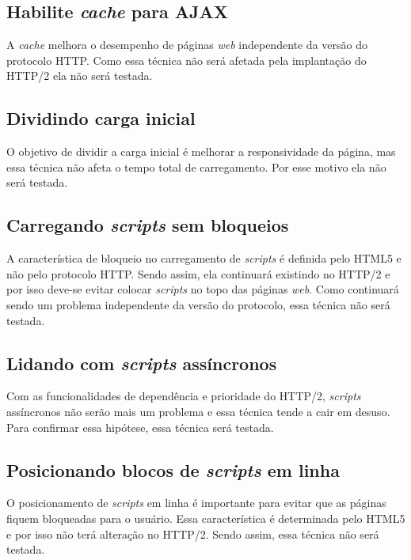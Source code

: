 \subsection{Habilite \textit{cache} para AJAX}
\label{subsec:preliminares_tec14}
A \textit{cache} melhora o desempenho de páginas \textit{web} independente da versão do protocolo HTTP. Como essa técnica não será afetada pela implantação do HTTP/2 ela não será testada.

\subsection{Dividindo carga inicial}
\label{subsec:preliminares_tec15}
O objetivo de dividir a carga inicial é melhorar a responsividade da página, mas essa técnica não afeta o tempo total de carregamento. Por esse motivo ela não será testada.

\subsection{Carregando \textit{scripts} sem bloqueios}
\label{subsec:preliminares_tec16}
A característica de bloqueio no carregamento de \textit{scripts} é definida pelo HTML5 e não pelo protocolo HTTP. Sendo assim, ela continuará existindo no HTTP/2 e por isso deve-se evitar colocar \textit{scripts} no topo das páginas \textit{web}. Como continuará sendo um problema independente da versão do protocolo, essa técnica não será testada.

\subsection{Lidando com \textit{scripts} assíncronos}
\label{subsec:preliminares_tec17}
Com as funcionalidades de dependência e prioridade do HTTP/2, \textit{scripts} assíncronos não serão mais um problema e essa técnica tende a cair em desuso. Para confirmar essa hipótese, essa técnica será testada.

\subsection{Posicionando blocos de \textit{scripts} em linha}
\label{subsec:preliminares_tec18}
O posicionamento de \textit{scripts} em linha é importante para evitar que as páginas fiquem bloqueadas para o usuário. Essa característica é determinada pelo HTML5 e por isso não terá alteração no HTTP/2. Sendo assim, essa técnica não será testada.

